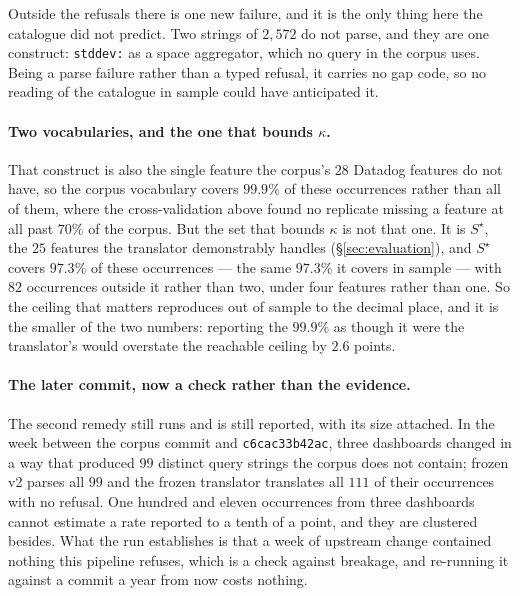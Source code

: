 Outside the refusals there is one new failure, and it is the only thing here the
catalogue did not predict. Two strings of $2{,}572$ do not parse, and they are one
construct: \texttt{stddev:} as a space aggregator, which no query in the corpus uses.
Being a parse failure rather than a typed refusal, it carries no gap code, so no reading
of the catalogue in sample could have anticipated it.

\paragraph{Two vocabularies, and the one that bounds $\kappa$.}
That construct is also the single feature the corpus's $28$ Datadog features do not have,
so the corpus vocabulary covers $99.9\%$ of these occurrences rather than all of them,
where the cross-validation above found no replicate missing a feature at all past $70\%$
of the corpus. But the set that bounds $\kappa$ is not that one. It is $S^\star$, the
$25$ features the translator demonstrably handles (\S\ref{sec:evaluation}), and
$S^\star$ covers $97.3\%$ of these occurrences --- the same $97.3\%$ it covers in sample
--- with $82$ occurrences outside it rather than two, under four features rather than
one. So the ceiling that matters reproduces out of sample to the decimal place, and it is
the smaller of the two numbers: reporting the $99.9\%$ as though it were the translator's
would overstate the reachable ceiling by $2.6$ points.

\paragraph{The later commit, now a check rather than the evidence.}
The second remedy still runs and is still reported, with its size attached. In the week
between the corpus commit and \texttt{c6cac33b42ac}, three dashboards changed in a way
that produced $99$ distinct query strings the corpus does not contain; frozen v2 parses
all $99$ and the frozen translator translates all $111$ of their occurrences with no
refusal. One hundred and eleven occurrences from three dashboards cannot estimate a rate
reported to a tenth of a point, and they are clustered besides. What the run establishes
is that a week of upstream change contained nothing this pipeline refuses, which is a
check against breakage, and re-running it against a commit a year from now costs nothing.

